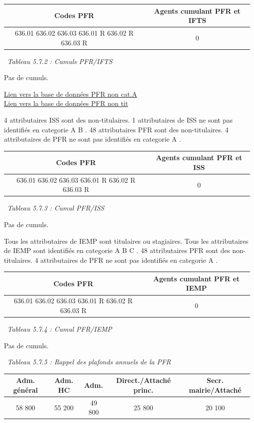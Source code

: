 \begin{longtable}[]{@{}cc@{}}
\toprule
Codes PFR & Agents cumulant PFR et IFTS\tabularnewline
\midrule
\endhead
636.01 636.02 636.03 636.01 R 636.02 R 636.03 R & 0\tabularnewline
\bottomrule
\end{longtable}

~\emph{Tableau 5.7.2 : Cumuls PFR/IFTS}

Pas de cumuls.

\href{../Bases/Reglementation/PFR.non.catA.csv}{Lien vers la base de
données PFR non cat.A}\\
\href{../Bases/Reglementation/PFR.non.tit.csv}{Lien vers la base de données
PFR non tit}

4 attributaires ISS sont des non-titulaires. 1 attributaires de ISS ne
sont pas identifiés en categorie A B . 48 attributaires PFR sont des
non-titulaires. 4 attributaires de PFR ne sont pas identifiés en
categorie A .

\begin{longtable}[]{@{}cc@{}}
\toprule
Codes PFR & Agents cumulant PFR et ISS\tabularnewline
\midrule
\endhead
636.01 636.02 636.03 636.01 R 636.02 R 636.03 R & 0\tabularnewline
\bottomrule
\end{longtable}

~\emph{Tableau 5.7.3 : Cumul PFR/ISS}

Pas de cumuls.

Tous les attributaires de IEMP sont titulaires ou stagiaires. Tous les
attributaires de IEMP sont identifiés en categorie A B C . 48
attributaires PFR sont des non-titulaires. 4 attributaires de PFR ne
sont pas identifiés en categorie A .

\begin{longtable}[]{@{}cc@{}}
\toprule
Codes PFR & Agents cumulant PFR et IEMP\tabularnewline
\midrule
\endhead
636.01 636.02 636.03 636.01 R 636.02 R 636.03 R & 0\tabularnewline
\bottomrule
\end{longtable}

~\emph{Tableau 5.7.4 : Cumul PFR/IEMP}

Pas de cumuls.

~\emph{Tableau 5.7.5 : Rappel des plafonds annuels de la PFR}

\begin{longtable}[]{@{}ccccc@{}}
\toprule
Adm. général & Adm. HC & Adm. & Direct./Attaché princ. & Secr.
mairie/Attaché\tabularnewline
\midrule
\endhead
58 800 & 55 200 & 49 800 & 25 800 & 20 100\tabularnewline
\bottomrule
\end{longtable}

